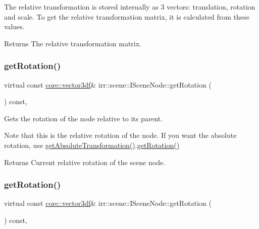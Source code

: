 The relative transformation is stored internally as 3 vectors\+: translation, rotation and scale. To get the relative transformation matrix, it is calculated from these values. \begin{DoxyReturn}{Returns}
The relative transformation matrix. 
\end{DoxyReturn}
\mbox{\label{classirr_1_1scene_1_1ISceneNode_acfef9f174e2398b479915791e4084061}} 
\subsubsection{\texorpdfstring{get\+Rotation()}{getRotation()}\hspace{0.1cm}{\footnotesize\ttfamily [1/2]}}
{\footnotesize\ttfamily virtual const \hyperlink{namespaceirr_1_1core_ae6e2b2a6c552833ebbd5b7463d03586b}{core\+::vector3df}\& irr\+::scene\+::\+I\+Scene\+Node\+::get\+Rotation (\begin{DoxyParamCaption}{ }\end{DoxyParamCaption}) const\hspace{0.3cm}{\ttfamily [inline]}, {\ttfamily [virtual]}}



Gets the rotation of the node relative to its parent. 

Note that this is the relative rotation of the node. If you want the absolute rotation, use \hyperlink{classirr_1_1scene_1_1ISceneNode_af13dc546a7be796cc0868a2eec51e508}{get\+Absolute\+Transformation()}.\hyperlink{classirr_1_1scene_1_1ISceneNode_acfef9f174e2398b479915791e4084061}{get\+Rotation()} \begin{DoxyReturn}{Returns}
Current relative rotation of the scene node. 
\end{DoxyReturn}
\mbox{\label{classirr_1_1scene_1_1ISceneNode_acfef9f174e2398b479915791e4084061}} 
\subsubsection{\texorpdfstring{get\+Rotation()}{getRotation()}\hspace{0.1cm}{\footnotesize\ttfamily [2/2]}}
{\footnotesize\ttfamily virtual const \hyperlink{namespaceirr_1_1core_ae6e2b2a6c552833ebbd5b7463d03586b}{core\+::vector3df}\& irr\+::scene\+::\+I\+Scene\+Node\+::get\+Rotation (\begin{DoxyParamCaption}{ }\end{DoxyParamCaption}) const\hspace{0.3cm}{\ttfamily [inline]}, {\ttfamily [virtual]}}



